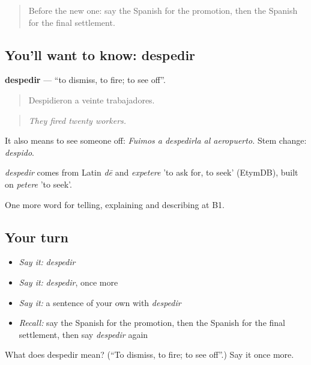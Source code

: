 \begin{quote}
Before the new one: say the Spanish for the promotion, then the Spanish for the final settlement.
\end{quote}

\subsection*{You'll want to know: despedir}
\textbf{despedir} — \textquotedblleft{}to dismiss, to fire; to see off\textquotedblright{}.

\begin{quote}
Despidieron a veinte trabajadores.
\end{quote}

\begin{quote}
\emph{They fired twenty workers.}
\end{quote}

It also means to see someone off: \emph{Fuimos a despedirla al aeropuerto.} Stem change: \emph{despido}.

\begin{cousinweb}
\emph{despedir} comes from Latin \emph{dē} and \emph{expetere} 'to ask for, to seek' (EtymDB), built on \emph{petere} 'to seek'.
\end{cousinweb}

\begin{grammarlens}[title={What you've built}]
One more word for telling, explaining and describing at B1.
\end{grammarlens}

\subsection*{Your turn}
\begin{itemize}
\raggedright
  \item \emph{Say it:} \emph{despedir}
  \item \emph{Say it:} \emph{despedir}, once more
  \item \emph{Say it:} a sentence of your own with \emph{despedir}
  \item \emph{Recall:} say the Spanish for the promotion, then the Spanish for the final settlement, then say \emph{despedir} again
\end{itemize}

\begin{tcolorbox}[breakable,colback=teal!4,colframe=teal!35!black,title={Before you move on}]
What does despedir mean? (\textquotedblleft{}To dismiss, to fire; to see off\textquotedblright{}.) Say it once more.
\end{tcolorbox}
